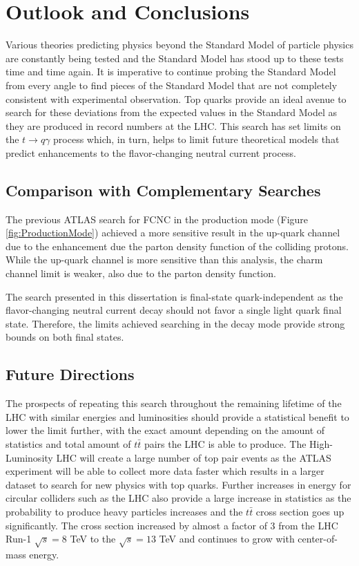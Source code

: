 
\chapter{Outlook and Conclusions}
\label{ch:Conclusion}
Various theories predicting physics beyond the Standard Model of particle physics are constantly being tested and the Standard Model has stood up to these tests time and time again.  It is imperative to continue probing the Standard Model from every angle to find pieces of the Standard Model that are not completely consistent with experimental observation.  Top quarks provide an ideal avenue to search for these deviations from the expected values in the Standard Model as they are produced in record numbers at the LHC.  This search has set limits on the $t\rightarrow q \gamma$ process which, in turn, helps to limit future theoretical models that predict enhancements to the flavor-changing neutral current process.

\section{Comparison with Complementary Searches}

The previous ATLAS search for FCNC in the production mode (Figure \ref{fig:ProductionMode})\cite{GregorFCNC} achieved a more sensitive result in the up-quark channel due to the
enhancement due the parton density function of the colliding protons. While the up-quark channel is more sensitive than this analysis, the charm channel limit is weaker, also due to the parton density function.

The search presented in this dissertation is final-state quark-independent as the flavor-changing neutral current decay should not favor a single light quark final state.  Therefore, the limits achieved searching in the decay mode provide strong bounds on both final states. 

\section{Future Directions}
The prospects of repeating this search throughout the remaining lifetime of the LHC with similar energies and luminosities should provide a statistical benefit to lower the limit further, with the exact amount depending on the amount of statistics and total amount of $t\bar{t}$ pairs the LHC is able to produce.  The High-Luminosity LHC will create a large number of top pair events as the ATLAS experiment will be able to collect more data faster which results in a larger dataset to search for new physics with top quarks.  Further increases in energy for circular colliders such as the LHC also provide a large increase in statistics as the probability to produce heavy particles increases and the $t\bar{t}$ cross section goes up significantly.  The cross section increased by almost a factor of 3 from the LHC Run-1 $\sqrt{s}=8$ TeV to the $\sqrt{s}=13$ TeV and continues to grow with center-of-mass energy.

